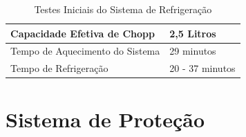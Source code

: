                         \begin{table}[H]
                            \centering
                            \caption{Testes Iniciais do Sistema de Refrigeração}
                            \label{testes-refrigeracao}
                            \begin{tabular}{|l|l|}
                                \hline
                                Capacidade Efetiva de Chopp & 2,5 Litros \\ \hline
                                Tempo de Aquecimento do Sistema & 29 minutos \\ \hline
                                Tempo de Refrigeração &  20 - 37 minutos\\ \hline
                            \end{tabular}
                        \end{table}
                        
    \section[Sistema de Proteção]{Sistema de Proteção}